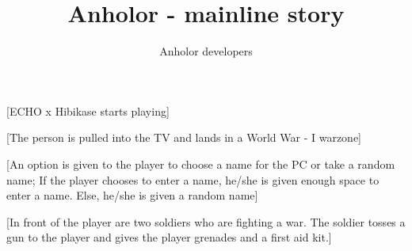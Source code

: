 \documentclass[a4paper,12pt]{report}
\title {Anholor - mainline story}
\author {Anholor developers}
\begin{document}
\newline

[ECHO x Hibikase starts playing]\newline

[The person is pulled into the TV and lands in a World War - I warzone]\newline

[An option is given to the player to choose a name for the PC or take a random name; If the player chooses to enter a name, he/she is given enough space to enter a name. Else, he/she is given a random name]\newline

[In front of the player are two soldiers who are fighting a war. The soldier tosses a gun to the player and gives the player grenades and a first aid kit.]\newline
\end{document}
